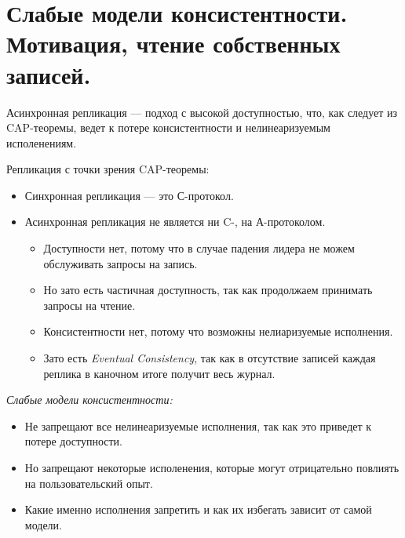 \section{Слабые модели консистентности. Мотивация, чтение собственных записей.}

\begin{remark}
    Асинхронная репликация --- подход с высокой доступностью, что, как следует из CAP-теоремы, ведет к потере консистентности и нелинеаризуемым исполенениям.
\end{remark}

\begin{remark}
    Репликация с точки зрения CAP-теоремы:
    \begin{itemize}
        \item Синхронная репликация --- это С-протокол.
        \item Асинхронная репликация не является ни C-, на А-протоколом.
        \begin{itemize}
            \item Доступности нет, потому что в случае падения лидера не можем обслуживать запросы на запись.
            \item Но зато есть частичная доступность, так как продолжаем принимать запросы на чтение.
            \item Консистентности нет, потому что возможны нелиаризуемые исполнения.
            \item Зато есть \textit{Eventual Consistency}, так как в отсутствие записей каждая реплика в каночном итоге получит весь журнал.
        \end{itemize}
    \end{itemize}
\end{remark}

\begin{definition}
    \textit{Слабые модели консистентности:}
    \begin{itemize}
        \item Не запрещают все нелинеаризуемые исполнения, так как это приведет к потере доступности.
        \item Но запрещают некоторые исполенения, которые могут отрицательно повлиять на пользовательский опыт.
        \item Какие именно исполнения запретить и как их избегать зависит от самой модели.
    \end{itemize}

\end{definition}

